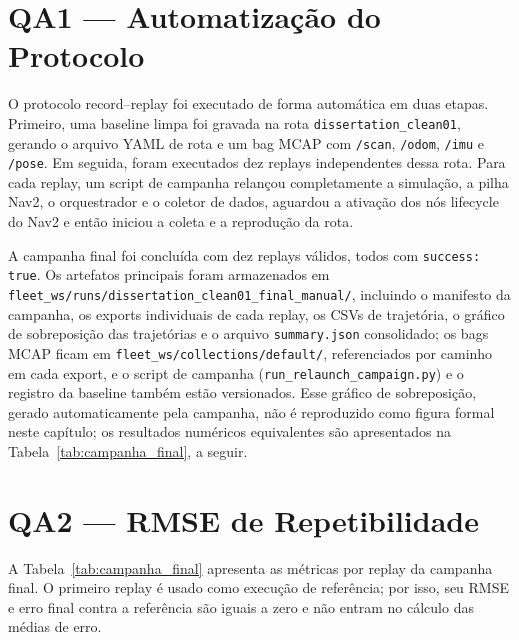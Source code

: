 \section{QA1 --- Automatização do Protocolo}
\label{sec:res_qa1}

O protocolo record--replay foi executado de forma automática em duas etapas.
Primeiro, uma baseline limpa foi gravada na rota
\texttt{dissertation\_\allowbreak clean01}, gerando o arquivo YAML de rota e um
bag MCAP com \texttt{/\allowbreak scan}, \texttt{/\allowbreak odom},
\texttt{/\allowbreak imu} e \texttt{/\allowbreak pose}. Em seguida, foram
executados dez replays independentes dessa rota. Para cada replay, um script de
campanha relançou completamente a simulação, a pilha Nav2, o orquestrador e o
coletor de dados, aguardou a ativação dos nós lifecycle do Nav2 e então iniciou
a coleta e a reprodução da rota.

A campanha final foi concluída com dez replays válidos, todos com
\texttt{success: true}. Os artefatos principais foram armazenados em
\texttt{fleet\_\allowbreak ws/\allowbreak runs/\allowbreak dissertation\_\allowbreak clean01\_\allowbreak final\_\allowbreak manual/},
incluindo o manifesto da campanha, os exports individuais de cada replay, os
CSVs de trajetória, o gráfico de sobreposição das trajetórias e o
arquivo \texttt{summary.json} consolidado; os bags MCAP ficam em
\texttt{fleet\_\allowbreak ws/\allowbreak collections/\allowbreak default/}, referenciados
por caminho em cada export, e o script de campanha
(\texttt{run\_\allowbreak relaunch\_\allowbreak campaign.py}) e o registro da baseline
também estão versionados. Esse gráfico de sobreposição, gerado
automaticamente pela campanha, não é reproduzido como figura formal neste
capítulo; os resultados numéricos equivalentes são apresentados na
Tabela~\ref{tab:campanha_final}, a seguir.

\section{QA2 --- RMSE de Repetibilidade}
\label{sec:res_qa2}

A Tabela~\ref{tab:campanha_final} apresenta as métricas por replay da campanha
final. O primeiro replay é usado como execução de referência; por isso, seu RMSE
e erro final contra a referência são iguais a zero e não entram no cálculo das
médias de erro.

